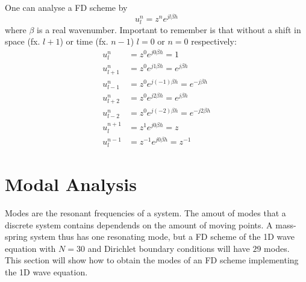 One can analyse a FD scheme by 
\begin{equation}
    u_l^n = z^n e^{jl\beta h}
\end{equation}
where $\beta$ is a real wavenumber. Important to remember is that without a shift in space (fx. $l+1$) or time (fx. $n-1$) $l = 0$ or $n=0$ respectively:
\begin{subequations} \label{eq:identitiesZ}
    \begin{align}
        u_l^n &= z^0 e^{j0\beta h} = 1\\
        u_{l+1}^n &= z^0 e^{j1\beta h} = e^{j\beta h}\\
        u_{l-1}^n &= z^0 e^{j(-1)\beta h} = e^{-j\beta h}\\
        u_{l+2}^n &= z^0 e^{j2\beta h} = e^{j\beta h}\\
        u_{l-2}^n &= z^0 e^{j(-2)\beta h}= e^{-j2\beta h}\\
        u_l^{n+1}&= z^1 e^{j0\beta h} = z\\
        u_l^{n-1}&= z^{-1} e^{j0\beta h} = z^{-1}
    \end{align}
\end{subequations}


\section{Modal Analysis}
\label{sec:modalAnalysis}
Modes are the resonant frequencies of a system. The amout of modes that a discrete system contains dependends on the amount of moving points. A mass-spring system thus has one resonating mode, but a FD scheme of the 1D wave equation with $N = 30$ and Dirichlet boundary conditions will have $29$ modes. This section will show how to obtain the modes of an FD scheme implementing the 1D wave equation. 

